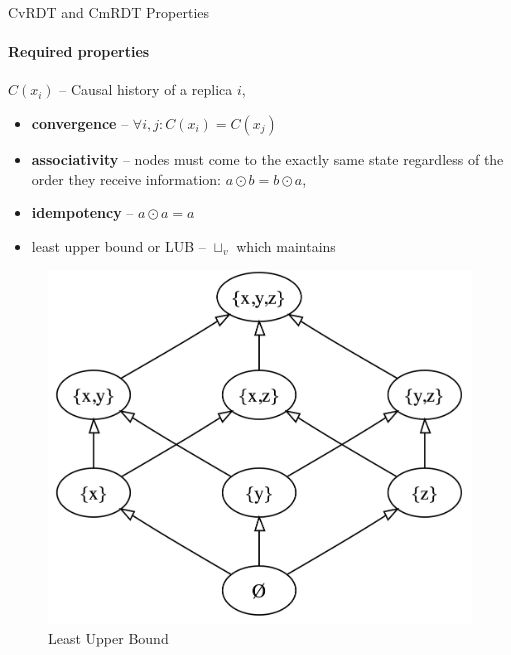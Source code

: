 \documentclass{beamer}
\begin{document}
\begin{frame}{CvRDT and CmRDT Properties}
\framesubtitle{Required properties}

$C(x_i)$ – Causal history of a replica $i$, 

\begin{itemize}
	\item \textbf{convergence} – $\forall i,j : C(x_i) = C(x_j)$
	\item \textbf{associativity} – nodes must come to the exactly same state regardless of the order they receive information: $a \odot b = b \odot a$, 
	\item \textbf{idempotency} – $a \odot a = a$
	\item least upper bound or LUB – $\sqcup_v$ which maintains
\end{itemize}

\begin{figure}[!ht]
	\includegraphics[scale=0.15]{LUB.png}    
	\caption{Least Upper Bound}
\end{figure}

\end{frame}


\end{document}
